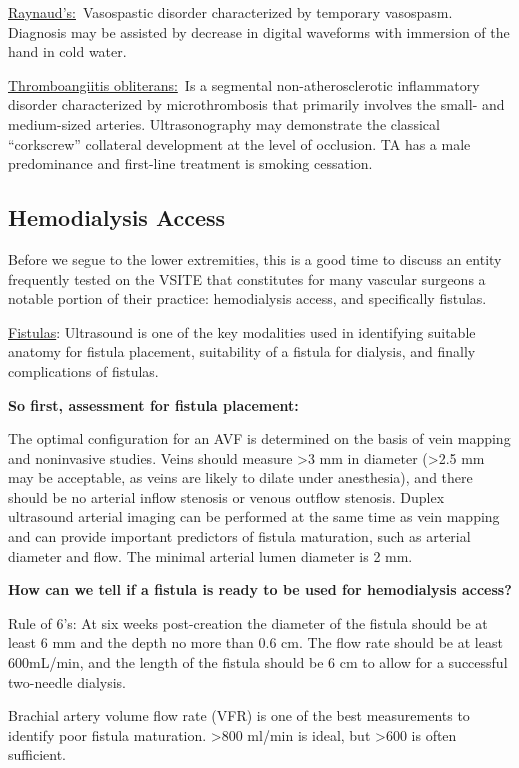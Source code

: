 \documentclass[
]{book}
\begin{document}
\uline{Raynaud's:}~Vasospastic disorder characterized by temporary
vasospasm. Diagnosis may be assisted by decrease in digital waveforms
with immersion of the hand in cold water.

\uline{Thromboangiitis obliterans:}~Is a segmental
non-atherosclerotic inflammatory disorder characterized by
microthrombosis that primarily involves the small- and medium-sized
arteries. Ultrasonography may demonstrate the classical ``corkscrew''
collateral development at the level of occlusion. TA has a male
predominance and first-line treatment is smoking cessation.

\hypertarget{hemodialysis-access}{%
\subsection{Hemodialysis Access}\label{hemodialysis-access}}

Before we segue to the lower extremities, this is a good time to discuss
an entity frequently tested on the VSITE that constitutes for many
vascular surgeons a notable portion of their practice: hemodialysis
access, and specifically fistulas.

\uline{Fistulas}: Ultrasound is one of the key modalities used in
identifying suitable anatomy for fistula placement, suitability of a
fistula for dialysis, and finally complications of fistulas.

\textbf{So first, assessment for fistula placement:}

The optimal configuration for an AVF is determined on the basis of vein
mapping and noninvasive studies. Veins should measure \textgreater3 mm in diameter
(\textgreater2.5 mm may be acceptable, as veins are likely to dilate under
anesthesia), and there should be no arterial inflow stenosis or venous
outflow stenosis. Duplex ultrasound arterial imaging can be performed at
the same time as vein mapping and can provide important predictors of
fistula maturation, such as arterial diameter and flow. The minimal
arterial lumen diameter is 2 mm.

\textbf{How can we tell if a fistula is ready to be used for hemodialysis
access?}

Rule of 6's: At six weeks post-creation the diameter of the fistula
should be at least 6 mm and the depth no more than 0.6 cm. The flow rate
should be at least 600mL/min, and the length of the fistula should be 6
cm to allow for a successful two-needle dialysis.

Brachial artery volume flow rate (VFR) is one of the best measurements
to identify poor fistula maturation. \textgreater800 ml/min is ideal, but \textgreater600 is
often sufficient.\citep{ko2015}
\end{document}
